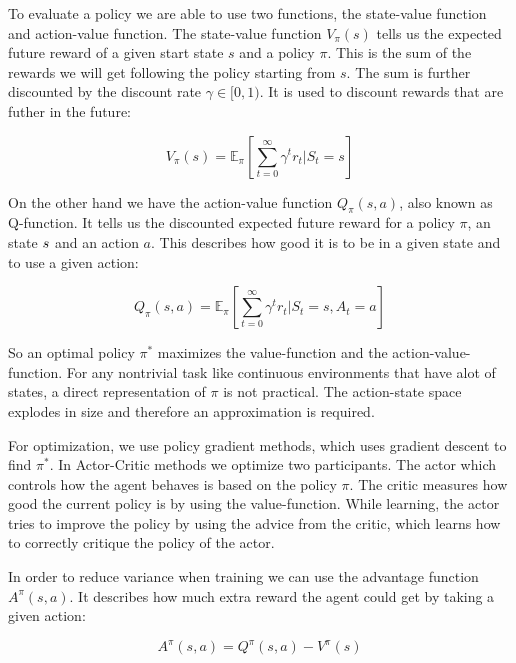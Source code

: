 To evaluate a policy we are able to use two functions, the state-value function and action-value function. The state-value function $V_\pi(s)$ tells us the expected future reward of a given start state $s$ and a policy $\pi$. This is the sum of the rewards we will get following the policy starting from $s$. The sum is further discounted by the discount rate $\gamma \in [0,1)$. It is used to discount rewards that are futher in the future:

\begin{equation}
    V_\pi(s) = \mathbb{E}_\pi \left [ \sum_{t=0}^\infty \gamma^t r_t | S_t = s\right ] \nonumber
\end{equation} \par

On the other hand we have the action-value function $Q_\pi(s,a)$, also known as Q-function. It tells us the discounted expected future reward for a policy $\pi$, an state $s$ and an action $a$. This describes how good it is to be in a given state and to use a given action:

\begin{equation}
    Q_\pi(s,a) = \mathbb{E}_\pi [\sum_{t=0}^\infty \gamma^t r_t | S_t = s, A_t = a] \nonumber
\end{equation} \par

So an optimal policy $\pi^*$ maximizes the value-function and the action-value-function. For any nontrivial task like continuous environments that have alot of states, a direct representation of $\pi$ is not practical. The action-state space explodes in size and therefore an approximation is required. \par

For optimization, we use policy gradient methods, which uses gradient descent to find $\pi^*$. In Actor-Critic methods we optimize two participants. The actor which controls how the agent behaves is based on the policy $\pi$. The critic measures how good the current policy is by using the value-function. While learning, the actor tries to improve the policy by using the advice from the critic, which learns how to correctly critique the policy of the actor. \par

In order to reduce variance when training we can use the advantage function $A^\pi(s,a)$. It describes how much extra reward the agent could get by taking a given action:

\begin{equation}
    A^\pi(s,a) = Q^\pi(s,a) - V^\pi(s)\nonumber
\end{equation} 

